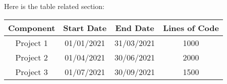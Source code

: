 \documentclass{article}
\begin{document}
Here is the table related section: \\



\begin{tabular}{|c|c|c|c|}

\hline

Component & Start Date & End Date & Lines of Code \\

\hline

Project 1 & 01/01/2021 & 31/03/2021 & 1000 \\

Project 2 & 01/04/2021 & 30/06/2021 & 2000 \\

Project 3 & 01/07/2021 & 30/09/2021 & 1500 \\

\hline

\end{tabular}
\end{document}
